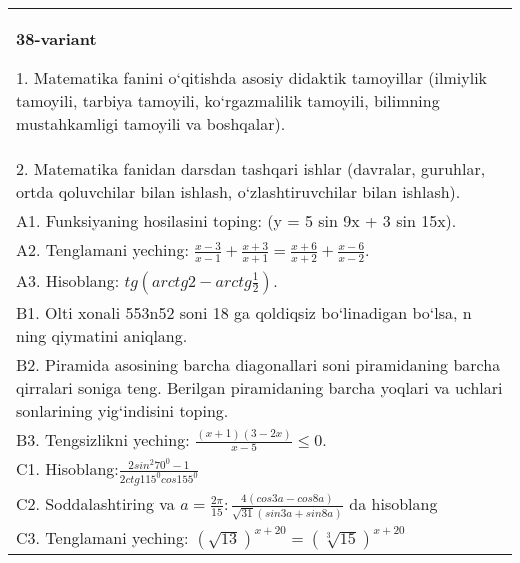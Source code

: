 \documentclass{article}
\begin{document}
\begin{tabular}{m{17cm}}
\textbf{38-variant}

1. Matematika fanini o‘qitishda asosiy didaktik tamoyillar (ilmiylik tamoyili, tarbiya tamoyili, ko‘rgazmalilik tamoyili, bilimning mustahkamligi tamoyili va boshqalar). \\
2. Matematika fanidan darsdan tashqari ishlar (davralar, guruhlar, ortda qoluvchilar bilan ishlash, o‘zlashtiruvchilar bilan ishlash). \\
A1. Funksiyaning hosilasini toping: (y = 5 sin 9x + 3 sin 15x). \\
A2. Tenglamani yeching: \(\frac{x - 3}{x - 1} + \frac{x + 3}{x + 1} = \frac{x + 6}{x + 2} + \frac{x - 6}{x - 2}\). \\
A3. Hisoblang: \(tg\left(arctg2 - arctg\frac{1}{2} \right) \). \\
B1. Olti xonali 553n52 soni 18 ga qoldiqsiz bo‘linadigan bo‘lsa, n ning qiymatini aniqlang. \\
B2. Piramida asosining barcha diagonallari soni piramidaning barcha qirralari soniga teng. Berilgan piramidaning barcha yoqlari va uchlari sonlarining yig‘indisini toping. \\
B3. Tengsizlikni yeching: \(\frac{ (x + 1) (3 - 2x) }{x - 5} \leq 0\). \\
C1. Hisoblang:\(\frac{2sin^{2}70^{0} - 1}{2ctg115^{0}cos155^{0}}\) \\
C2. Soddalashtiring va \(a = \frac{2\pi}{15}:\frac{4 (cos3a - cos8a) }{\sqrt{31} (sin3a + sin8a) }\) da hisoblang \\
C3. Tenglamani yeching: \((\sqrt{13}) ^{x + 20} = (\sqrt[3]{15}) ^{x + 20}\) \\

\end{tabular}
\vspace{1cm}
\end{document}
